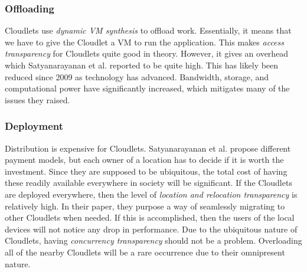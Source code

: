 \subsubsection{Offloading}
Cloudlets use \textit{dynamic VM synthesis} \cite{satyanarayanan_case_2009} to offload work. Essentially, it means that we have to give the Cloudlet a VM to run the application. This makes \textit{access transparency} for Cloudlets quite good in theory. However, it gives an overhead which Satyanarayanan et al.\cite{satyanarayanan_case_2009} reported to be quite high. This has likely been reduced since 2009 as technology has advanced. Bandwidth, storage, and computational power have significantly increased, which mitigates many of the issues they raised.

\subsubsection{Deployment}
Distribution is expensive for Cloudlets. Satyanarayanan et al. \cite{satyanarayanan_case_2009} propose different payment models, but each owner of a location has to decide if it is worth the investment. Since they are supposed to be ubiquitous, the total cost of having these readily available everywhere in society will be significant. If the Cloudlets are deployed everywhere, then the level of \textit{location and relocation transparency} is relatively high. In their paper, they purpose a way of seamlessly migrating to other Cloudlets when needed. If this is accomplished, then the users of the local devices will not notice any drop in performance. Due to the ubiquitous nature of Cloudlets, having \textit{concurrency transparency} should not be a problem. Overloading all of the nearby Cloudlets will be a rare occurrence due to their omnipresent nature.